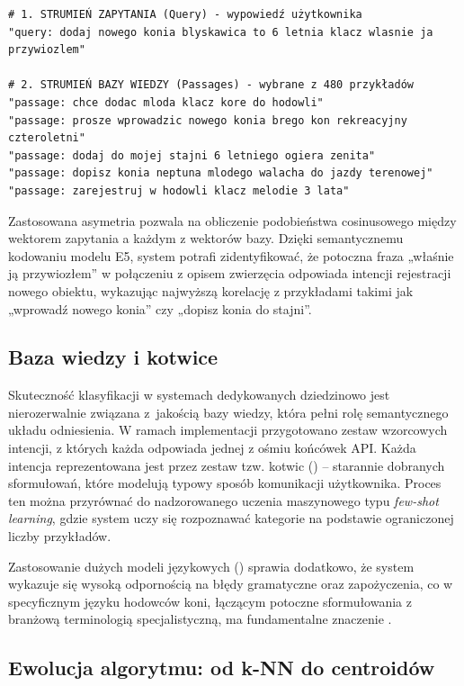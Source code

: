 \begin{verbatim}
# 1. STRUMIEŃ ZAPYTANIA (Query) - wypowiedź użytkownika
"query: dodaj nowego konia blyskawica to 6 letnia klacz wlasnie ja przywiozlem"

# 2. STRUMIEŃ BAZY WIEDZY (Passages) - wybrane z 480 przykładów
"passage: chce dodac mloda klacz kore do hodowli"
"passage: prosze wprowadzic nowego konia brego kon rekreacyjny czteroletni"
"passage: dodaj do mojej stajni 6 letniego ogiera zenita"
"passage: dopisz konia neptuna mlodego walacha do jazdy terenowej"
"passage: zarejestruj w hodowli klacz melodie 3 lata"
\end{verbatim}



Zastosowana asymetria pozwala na obliczenie podobieństwa cosinusowego między wektorem zapytania a każdym z wektorów bazy. Dzięki semantycznemu kodowaniu modelu E5, system potrafi zidentyfikować, że potoczna fraza „właśnie ją przywiozłem” w połączeniu z opisem zwierzęcia odpowiada intencji rejestracji nowego obiektu, wykazując najwyższą korelację z przykładami takimi jak „wprowadź nowego konia” czy „dopisz konia do stajni”.



\subsection*{Baza wiedzy i kotwice}

Skuteczność klasyfikacji w systemach dedykowanych dziedzinowo jest nierozerwalnie związana z~jakością bazy wiedzy, która pełni rolę semantycznego układu odniesienia. W ramach implementacji przygotowano zestaw wzorcowych intencji, z których każda odpowiada jednej z ośmiu końcówek API. Każda intencja reprezentowana jest przez zestaw tzw. kotwic () -- starannie dobranych sformułowań, które modelują typowy sposób komunikacji użytkownika. Proces ten można przyrównać do nadzorowanego uczenia maszynowego typu \textit{few-shot learning}, gdzie system uczy się rozpoznawać kategorie na podstawie ograniczonej liczby przykładów.

Zastosowanie {dużych modeli językowych} () sprawia dodatkowo, że system wykazuje się wysoką odpornością na błędy gramatyczne oraz zapożyczenia, co w specyficznym języku hodowców koni, łączącym potoczne sformułowania z branżową terminologią specjalistyczną, ma fundamentalne znaczenie \cite{wang2022}.

\subsection*{Ewolucja algorytmu: od k-NN do centroidów}

